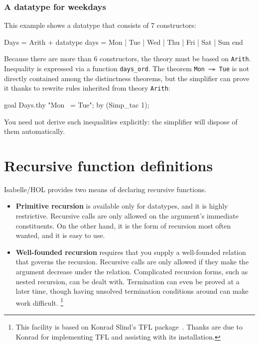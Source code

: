 \subsubsection{A datatype for weekdays}

This example shows a datatype that consists of 7 constructors:
\begin{ttbox}
Days = Arith +
  datatype days = Mon | Tue | Wed | Thu | Fri | Sat | Sun
end
\end{ttbox}
Because there are more than 6 constructors, the theory must be based
on \texttt{Arith}.  Inequality is expressed via a function
\verb|days_ord|.  The theorem \verb|Mon ~= Tue| is not directly
contained among the distinctness theorems, but the simplifier can
prove it thanks to rewrite rules inherited from theory \texttt{Arith}:
\begin{ttbox}
goal Days.thy "Mon ~= Tue";
by (Simp_tac 1);
\end{ttbox}
You need not derive such inequalities explicitly: the simplifier will dispose
of them automatically.


\section{Recursive function definitions}\label{sec:HOL:recursive}

Isabelle/HOL provides two means of declaring recursive functions.
\begin{itemize}
\item \textbf{Primitive recursion} is available only for datatypes, and it is
  highly restrictive.  Recursive calls are only allowed on the argument's
  immediate constituents.  On the other hand, it is the form of recursion most
  often wanted, and it is easy to use.
  
\item \textbf{Well-founded recursion} requires that you supply a well-founded
  relation that governs the recursion.  Recursive calls are only allowed if
  they make the argument decrease under the relation.  Complicated recursion
  forms, such as nested recursion, can be dealt with.  Termination can even be
  proved at a later time, though having unsolved termination conditions around
  can make work difficult.%
  \footnote{This facility is based on Konrad Slind's TFL
    package~\cite{slind-tfl}.  Thanks are due to Konrad for implementing TFL
    and assisting with its installation.}
\end{itemize}


